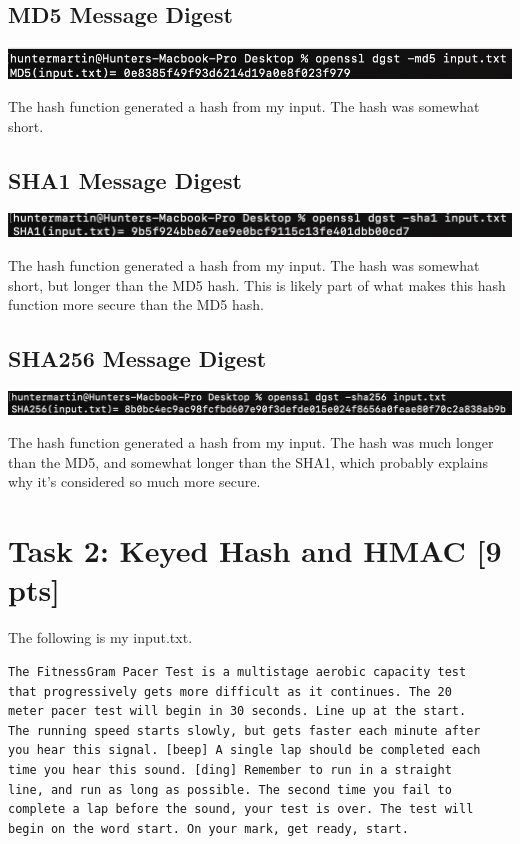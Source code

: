 \documentclass{article}
\begin{document}
\subsection{MD5 Message Digest}
\begin{center}
    \includegraphics[scale=0.75]{md5-task1.png}
\end{center}

The hash function generated a hash from my input.  The hash was somewhat short.

\subsection{SHA1 Message Digest}
\begin{center}
    \includegraphics[scale=0.75]{sha1-task1.png}
\end{center}

The hash function generated a hash from my input.  The hash was somewhat short, but longer than the MD5 hash.  This is likely part of what makes this hash function more secure than the MD5 hash.

\subsection{SHA256 Message Digest}
\begin{center}
    \includegraphics[scale=0.75]{sha256-task1.png}
\end{center}

The hash function generated a hash from my input.  The hash was much longer than the MD5, and somewhat longer than the SHA1, which probably explains why it's considered so much more secure.

\section{Task 2: Keyed Hash and HMAC [9 pts]}
The following is my input.txt.
\begin{verbatim}
The FitnessGram Pacer Test is a multistage aerobic capacity test
that progressively gets more difficult as it continues. The 20
meter pacer test will begin in 30 seconds. Line up at the start.
The running speed starts slowly, but gets faster each minute after
you hear this signal. [beep] A single lap should be completed each
time you hear this sound. [ding] Remember to run in a straight
line, and run as long as possible. The second time you fail to
complete a lap before the sound, your test is over. The test will
begin on the word start. On your mark, get ready, start.
\end{verbatim}
\end{document}
